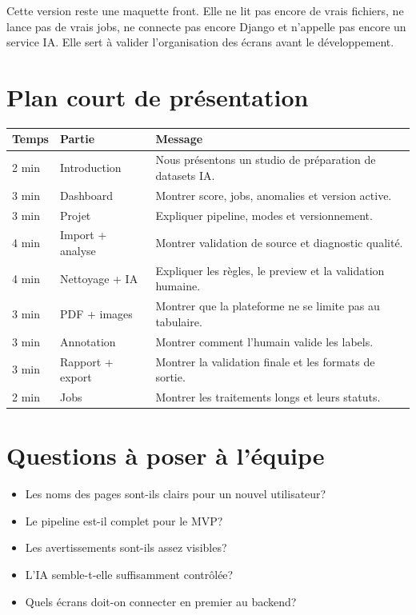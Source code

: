 \documentclass[10pt,a4paper]{article}
\begin{document}
Cette version reste une maquette front. Elle ne lit pas encore de vrais fichiers, ne lance pas de vrais jobs, ne connecte pas encore Django et n'appelle pas encore un service IA. Elle sert \`a valider l'organisation des \'ecrans avant le d\'eveloppement.

\section{Plan court de pr\'esentation}

\begin{tabular}{|p{}|p{}|p{}|}
\hline
\textbf{Temps} & \textbf{Partie} & \textbf{Message} \\
\hline
2 min & Introduction & Nous pr\'esentons un studio de pr\'eparation de datasets IA. \\
\hline
3 min & Dashboard & Montrer score, jobs, anomalies et version active. \\
\hline
3 min & Projet & Expliquer pipeline, modes et versionnement. \\
\hline
4 min & Import + analyse & Montrer validation de source et diagnostic qualit\'e. \\
\hline
4 min & Nettoyage + IA & Expliquer les r\`egles, le preview et la validation humaine. \\
\hline
3 min & PDF + images & Montrer que la plateforme ne se limite pas au tabulaire. \\
\hline
3 min & Annotation & Montrer comment l'humain valide les labels. \\
\hline
3 min & Rapport + export & Montrer la validation finale et les formats de sortie. \\
\hline
2 min & Jobs & Montrer les traitements longs et leurs statuts. \\
\hline
\end{tabular}

\section{Questions \`a poser \`a l'\'equipe}

\begin{itemize}
  \item Les noms des pages sont-ils clairs pour un nouvel utilisateur?
  \item Le pipeline est-il complet pour le MVP?
  \item Les avertissements sont-ils assez visibles?
  \item L'IA semble-t-elle suffisamment contr\^ol\'ee?
  \item Quels \'ecrans doit-on connecter en premier au backend?
\end{itemize}
\end{document}
